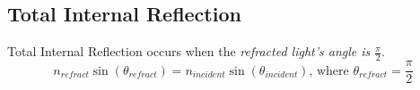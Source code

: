 	\subsection*{Total Internal Reflection} \label{subsec:Total Internal Reflection}
		\begin{definition} \label{def:Total Internal Reflection}
			Total Internal Reflection occurs when the \emph{refracted light's angle is $\frac{\pi}{2}$}.
			\begin{equation} \label{eq:Total Internal Reflection}
				n_{refract} \sin \left( \theta_{refract} \right) = n_{incident} \sin \left( \theta_{incident} \right) \text{, where } \theta_{refract} = \frac{\pi}{2}
			\end{equation}
		\end{definition}
		
